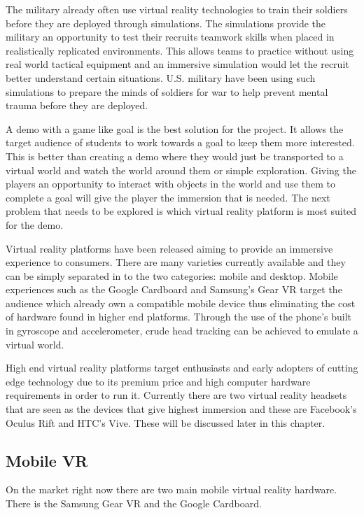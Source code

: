 \newline
\par
The military already often use virtual reality technologies to train their soldiers before they are deployed through simulations. The simulations provide the military an opportunity to test their recruits teamwork skills when placed in realistically replicated environments. This allows teams to practice without using real world tactical equipment and an immersive simulation would let the recruit better understand certain situations. U.S. military have been using such simulations to prepare the minds of soldiers for war to help prevent mental trauma before they are deployed\cite{militaryVR}.
\newline
\par
A demo with a game like goal is the best solution for the project. It allows the target audience of students to work towards a goal to keep them more interested. This is better than creating a demo where they would just be transported to a virtual world and watch the world around them or simple exploration. Giving the players an opportunity to interact with objects in the world and use them to complete a goal will give the player the immersion that is needed. The next problem that needs to be explored is which virtual reality platform is most suited for the demo.
\newline
\par
Virtual reality platforms have been released aiming to provide an immersive experience to consumers. There are many varieties currently available and they can be simply separated in to the two categories: mobile and desktop. Mobile experiences such as the Google Cardboard and Samsung's Gear VR target the audience which already own a compatible mobile device thus eliminating the cost of hardware found in higher end platforms. Through the use of the phone's built in gyroscope and accelerometer, crude head tracking can be achieved to emulate a virtual world.
\newline
\par
High end virtual reality platforms target enthusiasts and early adopters of cutting edge technology due to its premium price and high computer hardware requirements in order to run it. Currently there are two virtual reality headsets that are seen as the devices that give highest immersion and these are Facebook's Oculus Rift and HTC's Vive. These will be discussed later in this chapter. 

\subsection{Mobile VR}
On the market right now there are two main mobile virtual reality hardware. There is the Samsung Gear VR and the Google Cardboard.

